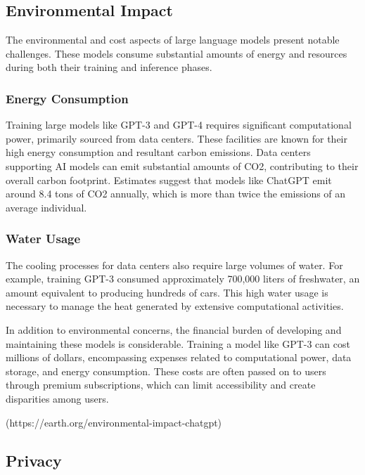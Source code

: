 \documentclass{article}
\begin{document}
\subsection{Environmental Impact}

The environmental and cost aspects of large language models present notable challenges. These models consume substantial amounts of energy and resources during both their training and inference phases.

\subsubsection{Energy Consumption}

Training large models like GPT-3 and GPT-4 requires significant computational power, primarily sourced from data centers. These facilities are known for their high energy consumption and resultant carbon emissions. Data centers supporting AI models can emit substantial amounts of CO2, contributing to their overall carbon footprint. Estimates suggest that models like ChatGPT emit around 8.4 tons of CO2 annually, which is more than twice the emissions of an average individual.

\subsubsection{Water Usage}

The cooling processes for data centers also require large volumes of water. For example, training GPT-3 consumed approximately 700,000 liters of freshwater, an amount equivalent to producing hundreds of cars. This high water usage is necessary to manage the heat generated by extensive computational activities.

In addition to environmental concerns, the financial burden of developing and maintaining these models is considerable. Training a model like GPT-3 can cost millions of dollars, encompassing expenses related to computational power, data storage, and energy consumption. These costs are often passed on to users through premium subscriptions, which can limit accessibility and create disparities among users.

(https://earth.org/environmental-impact-chatgpt)


\subsection{Privacy}
\end{document}
